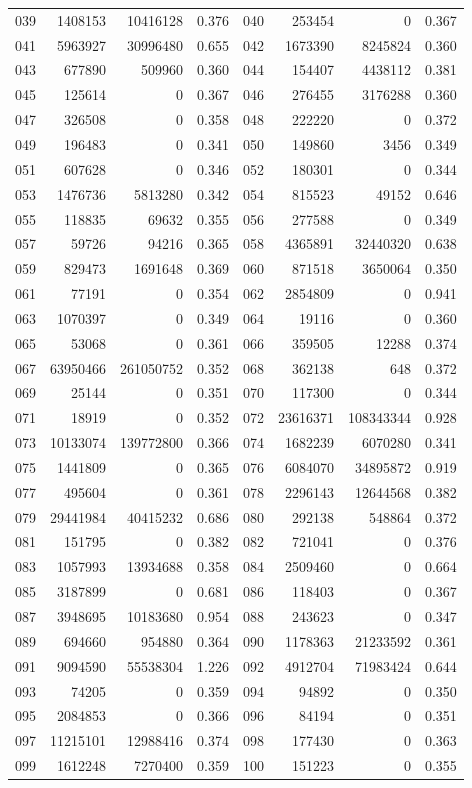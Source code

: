 \begin{longtable}{lrrr@{\hspace{16bp}}lrrr}
039 & 1408153 & 10416128 & 0.376 & 040 & 253454 & 0 & 0.367\\
041 & 5963927 & 30996480 & 0.655 & 042 & 1673390 & 8245824 & 0.360\\
043 & 677890 & 509960 & 0.360 & 044 & 154407 & 4438112 & 0.381\\
045 & 125614 & 0 & 0.367 & 046 & 276455 & 3176288 & 0.360\\
047 & 326508 & 0 & 0.358 & 048 & 222220 & 0 & 0.372\\
049 & 196483 & 0 & 0.341 & 050 & 149860 & 3456 & 0.349\\
051 & 607628 & 0 & 0.346 & 052 & 180301 & 0 & 0.344\\
053 & 1476736 & 5813280 & 0.342 & 054 & 815523 & 49152 & 0.646\\
055 & 118835 & 69632 & 0.355 & 056 & 277588 & 0 & 0.349\\
057 & 59726 & 94216 & 0.365 & 058 & 4365891 & 32440320 & 0.638\\
059 & 829473 & 1691648 & 0.369 & 060 & 871518 & 3650064 & 0.350\\
061 & 77191 & 0 & 0.354 & 062 & 2854809 & 0 & 0.941\\
063 & 1070397 & 0 & 0.349 & 064 & 19116 & 0 & 0.360\\
065 & 53068 & 0 & 0.361 & 066 & 359505 & 12288 & 0.374\\
067 & 63950466 & 261050752 & 0.352 & 068 & 362138 & 648 & 0.372\\
069 & 25144 & 0 & 0.351 & 070 & 117300 & 0 & 0.344\\
071 & 18919 & 0 & 0.352 & 072 & 23616371 & 108343344 & 0.928\\
073 & 10133074 & 139772800 & 0.366 & 074 & 1682239 & 6070280 & 0.341\\
075 & 1441809 & 0 & 0.365 & 076 & 6084070 & 34895872 & 0.919\\
077 & 495604 & 0 & 0.361 & 078 & 2296143 & 12644568 & 0.382\\
079 & 29441984 & 40415232 & 0.686 & 080 & 292138 & 548864 & 0.372\\
081 & 151795 & 0 & 0.382 & 082 & 721041 & 0 & 0.376\\
083 & 1057993 & 13934688 & 0.358 & 084 & 2509460 & 0 & 0.664\\
085 & 3187899 & 0 & 0.681 & 086 & 118403 & 0 & 0.367\\
087 & 3948695 & 10183680 & 0.954 & 088 & 243623 & 0 & 0.347\\
089 & 694660 & 954880 & 0.364 & 090 & 1178363 & 21233592 & 0.361\\
091 & 9094590 & 55538304 & 1.226 & 092 & 4912704 & 71983424 & 0.644\\
093 & 74205 & 0 & 0.359 & 094 & 94892 & 0 & 0.350\\
095 & 2084853 & 0 & 0.366 & 096 & 84194 & 0 & 0.351\\
097 & 11215101 & 12988416 & 0.374 & 098 & 177430 & 0 & 0.363\\
099 & 1612248 & 7270400 & 0.359 & 100 & 151223 & 0 & 0.355\\
\end{longtable}

